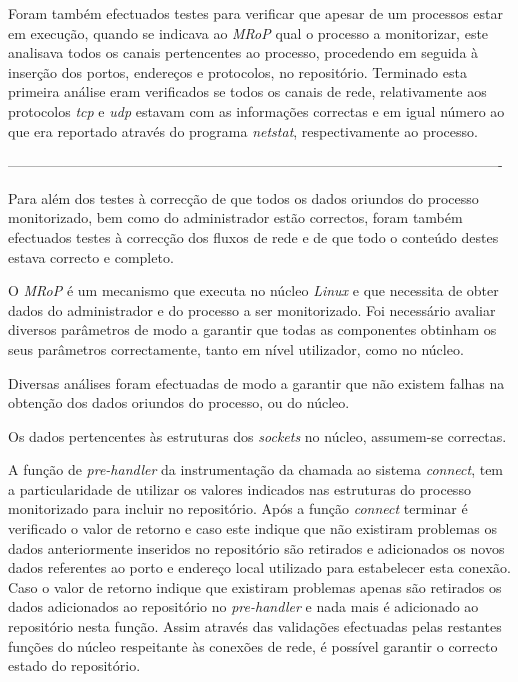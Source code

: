 Foram também efectuados testes para verificar que apesar de um processos estar em execução, quando se indicava ao \textit{MRoP} qual o processo a monitorizar, este analisava todos os canais pertencentes ao processo, procedendo em seguida à inserção dos portos, endereços e protocolos, no repositório.
Terminado esta primeira análise eram verificados se todos os canais de rede, relativamente aos protocolos \textit{tcp} e \textit{udp} estavam com as informações correctas e em igual número ao que era reportado através do programa \textit{netstat}, respectivamente ao processo.


----------------------------------------------------------------------------------------------------------

Para além dos testes à correcção de que todos os dados oriundos do processo monitorizado, bem como do administrador estão correctos, foram também efectuados testes à correcção dos fluxos de rede e de que todo o conteúdo destes estava correcto e completo.

O \textit{MRoP} é um mecanismo que executa no núcleo \textit{Linux} e que necessita de obter dados do administrador e do processo a ser monitorizado.
Foi necessário avaliar diversos parâmetros de modo a garantir que todas as componentes obtinham os seus parâmetros correctamente, tanto em nível utilizador, como no núcleo.

Diversas análises foram efectuadas de modo a garantir que não existem falhas na obtenção dos dados oriundos do processo, ou do núcleo.

Os dados pertencentes às estruturas dos \textit{sockets} no núcleo, assumem-se correctas.

A função de \textit{pre-handler} da instrumentação da chamada ao sistema \textit{connect}, tem a particularidade de utilizar os valores indicados nas estruturas do processo monitorizado para incluir no repositório.
Após a função \textit{connect} terminar é verificado o valor de retorno e caso este indique que não existiram problemas os dados anteriormente inseridos no repositório são retirados e adicionados os novos dados referentes ao porto e endereço local utilizado para estabelecer esta conexão.
Caso o valor de retorno indique que existiram problemas apenas são retirados os dados adicionados ao repositório no \textit{pre-handler} e nada mais é adicionado ao repositório nesta função.
Assim através das validações efectuadas pelas restantes funções do núcleo respeitante às conexões de rede, é possível garantir o correcto estado do repositório.



